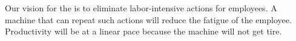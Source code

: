 Our vision for the \productname is to eliminate labor-intensive actions for employees. A machine that can repeat such actions will reduce the fatigue of the employee. Productivity will be at a linear pace because the machine will not get tire.